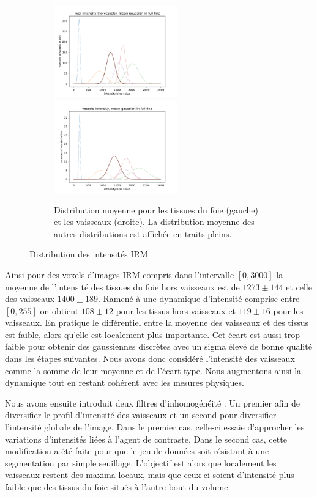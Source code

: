 \begin{figure}[!ht]
  \begin{subfigure}{\textwidth}
    \centering
    \includegraphics[height=4cm]{Images/gen_mri_liver_mean_intensity.pdf}
    \includegraphics[height=4cm]{Images/gen_mri_vessels_mean_intensity.pdf}
    \caption{Distribution moyenne pour les tissues du foie (gauche) et les vaisseaux (droite). La distribution moyenne des autres distributions est affichée en traits pleins.}
  \end{subfigure}
  \caption{Distribution des intensités IRM}
  \label{fig:Distributions_mri_intensities}
\end{figure}

Ainsi pour des voxels d'images IRM compris dans l'intervalle $[0,3000]$ la moyenne de l'intensité des tissues du foie hors vaisseaux est de $1273 \pm 144$ et celle des vaisseaux $1400 \pm 189$. Ramené à une dynamique d'intensité comprise entre $[0, 255]$ on obtient $108 \pm 12$ pour les tissus hors vaisseaux et $119 \pm 16$ pour les vaisseaux. En pratique le différentiel entre la moyenne des vaisseaux et des tissus est faible, alors qu'elle est localement plus importante. Cet écart est aussi trop faible pour obtenir des gaussiennes discrètes avec un sigma élevé de bonne qualité dans les étapes suivantes. Nous avons donc considéré l'intensité des vaisseaux comme la somme de leur moyenne et de l'écart type. Nous augmentons ainsi la dynamique tout en restant cohérent avec les mesures physiques.

Nous avons ensuite introduit deux filtres d'inhomogénéité : Un premier afin de diversifier le profil d'intensité des vaisseaux et un second pour diversifier l'intensité globale de l'image. Dans le premier cas, celle-ci essaie d'approcher les variations d'intensités liées à l'agent de contraste. Dans le second cas, cette modification a été faite pour que le jeu de données soit résistant à une segmentation par simple seuillage. L'objectif est alors que localement les vaisseaux restent des maxima locaux, mais que ceux-ci soient d'intensité plus faible que des tissus du foie situés à l'autre bout du volume.

